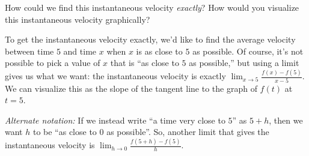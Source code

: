 \documentclass{article}
\begin{document}
\begin{enumerate}
\begin{enumerate}[resume]

    \begin{problem}[\vfill]
      How could we find this instantaneous velocity \emph{exactly}? How would you visualize this instantaneous velocity graphically?
    \end{problem}

    \begin{solution} 
      To get the instantaneous velocity exactly, we'd like to find the
      average velocity between time $5$ and time $x$ when $x$ is as close
      to $5$ as possible.  Of course, it's not possible to pick a value of
      $x$ that is ``as close to $5$ as possible,'' but using a limit gives
      us what we want: the instantaneous velocity is exactly
      $\displaystyle \lim_{x \to 5} \frac{f(x) - f(5)}{x - 5}$.  We can
      visualize this as the slope of the tangent line to the graph of
      $f(t)$ at $t = 5$.

      \emph{Alternate notation:} If we instead write ``a time very close
      to $5$'' as $5 + h$, then we want $h$ to be ``as close to $0$ as
      possible''.  So, another limit that gives the instantaneous velocity
      is $\displaystyle \lim_{h \to 0} \frac{f(5 + h) - f(5)}{h}$.

    \end{solution}

  \end{enumerate}
\end{enumerate}
\pspace{\newpage}
\end{document}
